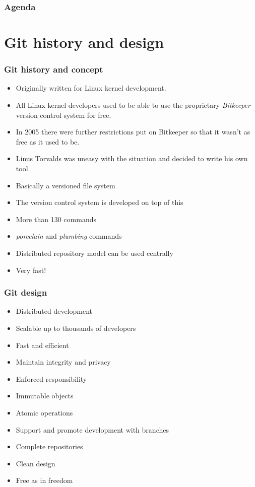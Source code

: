 \documentclass[handout,notes]{gittalk}
\begin{document}

\begin{frame}
  \frametitle{Agenda}
  \tableofcontents
\end{frame}

\section{Git history and design}

\begin{frame}
\frametitle{Git history and concept}
\begin{itemize}
  \item Originally written for Linux kernel development.
  \item All Linux kernel developers used to be able to use the proprietary
        \emph{Bitkeeper} version control system for free.
  \item In 2005 there were further restrictions put on Bitkeeper so that
        it wasn't as free as it used to be.
  \item Linus Torvalds was uneasy with the situation and decided to write his
        own tool.
\end{itemize}
\vspace*{1em}
\begin{itemize}
  \item Basically a versioned file system
  \item The version control system is developed on top of this
  \item More than 130 commands
  \item \emph{porcelain} and \emph{plumbing} commands
  \item Distributed repository model can be used centrally
  \item Very fast!
\end{itemize}

\end{frame}

\begin{frame}
\frametitle{Git design}
\begin{itemize}
  \item Distributed development
  \item Scalable up to thousands of developers
  \item Fast and efficient
  \item Maintain integrity and privacy
  \item Enforced responsibility
  \item Immutable objects
  \item Atomic operations
  \item Support and promote development with branches
  \item Complete repositories
  \item Clean design
  \item Free as in freedom
\end{itemize}
\end{frame}
\end{document}
